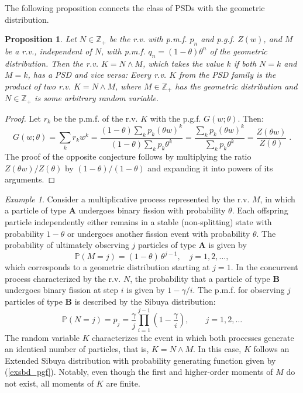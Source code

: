 \documentclass[a4paper,12pt]{amsart}
\newcommand{\Z}{\mathbb{Z}_{+}}
\newtheorem{Proposition}{Proposition}[section]
\theoremstyle{definition}
\theoremstyle{remark}
\newtheorem{Example}{Example}[section]
\begin{document}
\medskip

The following proposition connects the class of PSDs with the geometric distribution.
\begin{Proposition} \label{G2PSD}
Let $N \in \Z$  be the r.v. with p.m.f. $p_n$ and p.g.f. $Z(w)$, and $M$ be a r.v., independent of $N$, with p.m.f. $q_n=(1-\theta)\theta^n$ of the geometric distribution. Then the r.v. $K = N \wedge M$, which takes the value $k$ if both $N=k$ and $M=k$, has a PSD and vice versa: Every r.v. $K$ from the PSD family is the product of two r.v. $K = N \wedge M$,  where $M\in \Z$ has the geometric distribution and $N \in \Z$ is some arbitrary random variable.  
\end{Proposition}
\begin{proof}
Let $r_k$ be the p.m.f. of the r.v. $K$ with the p.g.f. $G(w;\theta)$. Then:
\begin{equation} \label{PSD2G}
G(w;\theta)=\sum_{k}r_k w^k=\frac{(1\!-\!\theta) \sum_{k}p_k (\theta w)^k}{(1\!-\!\theta) \sum_k p_k \theta^k} 
=\frac{\sum_{k}p_k (\theta w)^k}{\sum_{k}p_k\theta^k } =
\frac{Z(\theta w)}{Z(\theta)}\;. 
\end{equation}
The proof of the opposite conjecture follows by multiplying the ratio $Z(\theta w)/Z(\theta)$ by $(1-\theta)/(1-\theta)$ and expanding it into powers of its arguments. 
\end{proof} 


\begin{Example} \label{sibgeom}
Consider a multiplicative process represented by the r.v. $M$, in which a particle of type {\bf A} undergoes binary fission with probability $\theta$. Each offspring particle independently either remains in a stable (non-splitting) state with probability $1-\theta$ or undergoes another fission event with probability $\theta$. The probability of ultimately observing $j$ particles of type {\bf A} is given by
\[
\mathbb{P}(M = j) = (1-\theta)\,\theta^{j-1}, \quad j = 1, 2, \dots,
\]
which corresponds to a geometric distribution starting at $j=1$.
In the concurrent process characterized by the r.v. $N$, the probability that a particle of type {\bf B} undergoes binary fission at step $i$ is given by $1-\gamma/i$. The p.m.f. for observing $j$ particles of type {\bf B} is described by the Sibuya distribution:
\begin{equation}\label{Sbdpmf}
\mathbb{P}(N=j)=p_j=\frac{\gamma}{j}\prod_{i=1}^{j-1}\left(1-\frac{\gamma}{i}\right), \qquad j=1,2,\ldots
\end{equation}
The random variable $K$ characterizes the event in which both processes generate an identical number of particles, that is, $K = N \wedge M$. In this case, $K$ follows an Extended Sibuya distribution with probability generating function given by (\ref{exsbd_pgf}). Notably, even though the first and higher-order moments of $M$ do not exist, all moments of $K$ are finite.
\end{Example}
\end{document}
